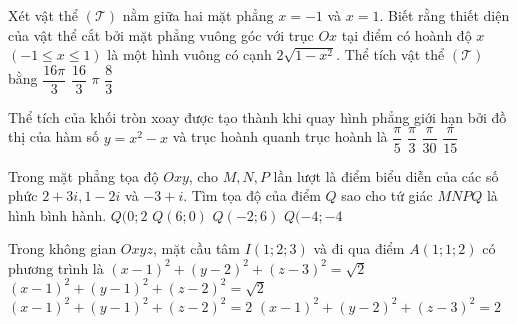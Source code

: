 \begin{ex}%
	Xét vật thể $(\mathcal{T})$ nằm giữa hai mặt phẳng $x=-1$ và $x=1$. Biết rằng thiết diện của vật thể cắt bởi mặt phẳng vuông góc với trục $Ox$ tại điểm có hoành độ $x$ $(-1\leq x\leq 1)$ là một hình vuông có cạnh $2\sqrt{1-x^2}$. Thể tích vật thể $(\mathcal{T})$ bằng
	\choice
	{$\dfrac{16\pi}{3}$}
	{\True $\dfrac{16}{3}$}
	{$\pi$}
	{$\dfrac{8}{3}$}
\end{ex}
\begin{ex}%
	Thể tích của khối tròn xoay được tạo thành khi quay hình phẳng giới hạn bởi đồ thị của hàm số $y=x^2-x$ và trục hoành quanh trục hoành là
	\choice
	{$\dfrac{\pi}{5}$}
	{$\dfrac{\pi}{3}$}
	{\True $\dfrac{\pi}{30}$}
	{$\dfrac{\pi}{15}$}
\end{ex}
\begin{ex}%
	Trong mặt phẳng tọa độ $Oxy$, cho $M,N,P$ lần lượt là điểm biểu diễn của các số phức $2+3i,1-2i$ và $-3+i$. Tìm tọa độ của điểm $Q$ sao cho tứ giác $MNPQ$ là hình bình hành.
	\choice
	{$Q(0;2$}
	{$Q(6;0)$}
	{\True $Q(-2;6)$}
	{$Q(-4;-4$}
\end{ex}
\begin{ex}%
	Trong không gian $Oxyz$, mặt cầu tâm $I(1;2;3)$ và đi qua điểm $A(1;1;2)$ có phương trình là 
	\choice
	{$(x-1)^2+(y-2)^2+(z-3)^2=\sqrt{2}$}
	{$(x-1)^2+(y-1)^2+(z-2)^2=\sqrt{2}$}
	{$(x-1)^2+(y-1)^2+(z-2)^2=2$}
	{\True $(x-1)^2+(y-2)^2+(z-3)^2=2$}
\end{ex}
